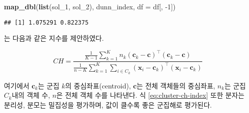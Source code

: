 \documentclass[]{book}
\newenvironment{Shaded}{\begin{snugshade}}{\end{snugshade}}
\newcommand{\DataTypeTok}[1]{\textcolor[rgb]{0.13,0.29,0.53}{#1}}
\newcommand{\DecValTok}[1]{\textcolor[rgb]{0.00,0.00,0.81}{#1}}
\newcommand{\KeywordTok}[1]{\textcolor[rgb]{0.13,0.29,0.53}{\textbf{#1}}}
\newcommand{\NormalTok}[1]{#1}
\newcommand{\OperatorTok}[1]{\textcolor[rgb]{0.81,0.36,0.00}{\textbf{#1}}}
\newcommand{\StringTok}[1]{\textcolor[rgb]{0.31,0.60,0.02}{#1}}
\begin{document}
\begin{Shaded}
\begin{Highlighting}[]
{{{{{{{{{{{{{\NormalTok{  res <-}\StringTok{ }\NormalTok{numerator }\OperatorTok{/}\StringTok{ }\NormalTok{denominator}
  
  \KeywordTok{return}\NormalTok{(res)}
\NormalTok{\}}
\end{Highlighting}
\end{Shaded}

\begin{Shaded}
\begin{Highlighting}[]
\KeywordTok{map_dbl}\NormalTok{(}\KeywordTok{list}\NormalTok{(sol_}\DecValTok{1}\NormalTok{, sol_}\DecValTok{2}\NormalTok{), dunn_index, }\DataTypeTok{df =}\NormalTok{ df[, }\DecValTok{-1}\NormalTok{])}
\end{Highlighting}
\end{Shaded}

\begin{verbatim}
## [1] 1.075291 0.822375
\end{verbatim}

\citet{calinski1974dendrite} 는 다음과 같은 지수를 제안하였다.

\begin{equation}
CH = \frac{\frac{1}{K - 1} \sum_{k = 1}^{K} n_k (\mathbf{c}_k - \mathbf{c})^\top (\mathbf{c}_k - \mathbf{c})}{\frac{1}{n - K} \sum_{k = 1}^{K} \sum_{i \in C_k} (\mathbf{x}_i - \mathbf{c}_k)^\top (\mathbf{x}_i - \mathbf{c}_k)} \label{eq:cluster-ch-index}
\end{equation}

여기에서 \(\mathbf{c}_k\)는 군집 \(k\)의 중심좌표(centroid), \(\mathbf{c}\)는 전체 객체들의 중심좌표, \(n_k\)는 군집 \(C_k\)내의 객체 수, \(n\)은 전체 객체 수를 나타낸다. 식 \eqref{eq:cluster-ch-index} 또한 분자는 분리성, 분모는 밀집성을 평가하며, 값이 클수록 좋은 군집해로 평가된다.
\end{document}
